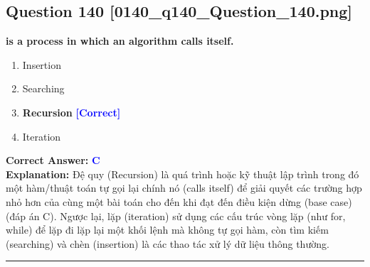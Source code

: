 \documentclass[11pt,a4paper]{article}
\begin{document}
\begin{minipage}{\textwidth}
\subsection*{Question 140 \quad \footnotesize{[0140\_q140\_Question\_140.png]}}
\noindent \textbf{is a process in which an algorithm calls itself.}

\begin{enumerate}[label=\Alph*.]
    \item Insertion
    \item Searching
    \item \textbf{Recursion} \hfill \textcolor{blue}{\textbf{[Correct]}}
    \item Iteration
\end{enumerate}

\noindent \textbf{Correct Answer:} \textcolor{blue}{\textbf{C}} \\[2pt]
\noindent \textbf{Explanation:} Đệ quy (Recursion) là quá trình hoặc kỹ thuật lập trình trong đó một hàm/thuật toán tự gọi lại chính nó (calls itself) để giải quyết các trường hợp nhỏ hơn của cùng một bài toán cho đến khi đạt đến điều kiện dừng (base case) (đáp án C). Ngược lại, lặp (iteration) sử dụng các cấu trúc vòng lặp (như for, while) để lặp đi lặp lại một khối lệnh mà không tự gọi hàm, còn tìm kiếm (searching) và chèn (insertion) là các thao tác xử lý dữ liệu thông thường.

\par\vspace{0.3cm}
\hrule
\vspace{0.3cm}
\end{minipage}
\end{document}
